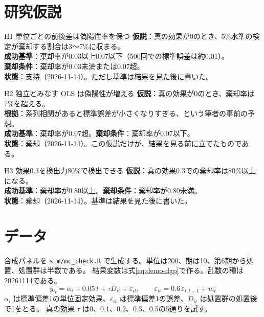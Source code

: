 \documentclass[a4paper,10pt]{ltjsarticle}
\begin{document}
\section{研究仮説}\label{sec:demo-hyp}

\begin{hypothesis}{H1 単位ごとの前後差は偽陽性率を保つ}
\textbf{仮説}：真の効果が0のとき、5\%水準の検定が棄却する割合は3〜7\%に収まる。\\
\textbf{成功基準}：棄却率が0.03以上0.07以下（500回での標準誤差は約0.01）。\\
\textbf{棄却条件}：棄却率が0.03未満または0.07超。\\
\textbf{状態}：支持（2026-11-14）。ただし基準は結果を見た後に書いた。
\end{hypothesis}

\begin{hypothesis}{H2 独立とみなす OLS は偽陽性が増える}
\textbf{仮説}：真の効果が0のとき、棄却率は7\%を超える。\\
\textbf{根拠}：系列相関があると標準誤差が小さくなりすぎる、という筆者の事前の予想。\\
\textbf{成功基準}：棄却率が0.07超。\quad\textbf{棄却条件}：棄却率が0.07以下。\\
\textbf{状態}：棄却（2026-11-14）。この仮説だけが、結果を見る前に立てたものである。
\end{hypothesis}

\begin{hypothesis}{H3 効果0.3を検出力80\%で検出できる}
\textbf{仮説}：真の効果0.3での棄却率は80\%以上になる。\\
\textbf{成功基準}：棄却率が0.80以上。\quad\textbf{棄却条件}：棄却率が0.80未満。\\
\textbf{状態}：棄却（2026-11-14）。基準は結果を見た後に書いた。
\end{hypothesis}

\section{データ}\label{sec:demo-data}
合成パネルを \texttt{sim/mc\_check.R} で生成する。単位は200、期は10、第6期から処置、処置群は半数である。
結果変数は式\ref{eq:demo-dgp}で作る。乱数の種は20261114である。
\begin{equation}
  y_{it} = \alpha_i + 0.05\,t + \tau D_{it} + \varepsilon_{it}, \qquad
  \varepsilon_{it} = 0.6\,\varepsilon_{i,t-1} + u_{it}
  \label{eq:demo-dgp}
\end{equation}
$\alpha_i$ は標準偏差1の単位固定効果、$\varepsilon_{it}$ は標準偏差1の誤差、$D_{it}$ は処置群の処置後で1をとる。
真の効果 $\tau$ は0、0.1、0.2、0.3、0.5の5通りを試す。
\end{document}
